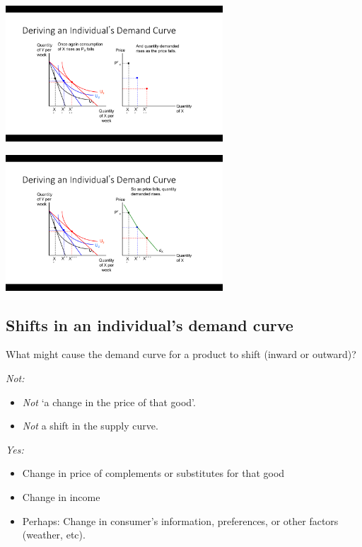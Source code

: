 \documentclass[]{article}
\providecommand{\tightlist}{%
  \setlength{\itemsep}{0pt}\setlength{\parskip}{0pt}}
\begin{document}
\includegraphics[height=2in]{picsfigs/dmd3.png}

\includegraphics[height=2in]{picsfigs/dmd4.png}

\hypertarget{shifts-in-an-individuals-demand-curve}{%
\subsection{Shifts in an individual's demand curve}\label{shifts-in-an-individuals-demand-curve}}

What might cause the demand curve for a product to shift (inward or outward)?

\emph{Not:}

\begin{itemize}
\tightlist
\item
  \emph{Not} `a change in the price of that good'.
\item
  \emph{Not} a shift in the supply curve.
\end{itemize}

\emph{Yes:}

\begin{itemize}
\tightlist
\item
  Change in price of complements or substitutes for that good
\item
  Change in income
\item
  Perhaps: Change in consumer's information, preferences, or other factors (weather, etc).
\end{itemize}
\end{document}
